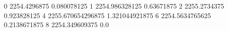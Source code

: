 0 2254.4296875 0.080078125
1 2254.986328125 0.63671875
2 2255.2734375 0.923828125
4 2255.670654296875 1.321044921875
6 2254.5634765625 0.2138671875
8 2254.349609375 0.0
